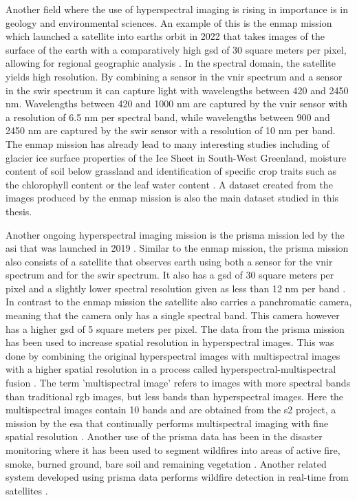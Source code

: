 Another field where the use of hyperspectral imaging is rising in importance is in geology and environmental sciences. An example of this is the \ac{enmap} mission which launched a satellite into earths orbit in 2022 that takes images of the surface of the earth with a comparatively high \ac{gsd} of 30 square meters per pixel, allowing for regional geographic analysis \citep{guanter_enmap_2015}. In the spectral domain, the satellite yields high resolution. By combining a sensor in the \ac{vnir} spectrum and a sensor in the \ac{swir} spectrum it can capture light with wavelengths between 420 and 2450 nm. Wavelengths between 420 and 1000 nm are captured by the \ac{vnir} sensor with a resolution of 6.5 nm per spectral band, while wavelengths between 900 and 2450 nm are captured by the \ac{swir} sensor with a resolution of 10 nm per band.
The \ac{enmap} mission has already lead to many interesting studies including of glacier ice surface properties of the Ice Sheet in South-West Greenland, moisture content of soil below grassland and identification of specific crop traits such as the chlorophyll content or the leaf water content \citep{bohn_glacier_2022}\citep{pascual-venteo_prototyping_2022}\citep{dopper_estimating_2022}.
A dataset created from the images produced by the \ac{enmap} mission is also the main dataset studied in this thesis.

Another ongoing hyperspectral imaging mission is the \ac{prisma} mission led by the \ac{asi} that was launched in 2019 \citep{loizzo_prisma_2019}. Similar to the \ac{enmap} mission, the \ac{prisma} mission also consists of a satellite that observes earth using both a sensor for the \ac{vnir} spectrum and for the \ac{swir} spectrum. It also has a \ac{gsd} of 30 square meters per pixel and a slightly lower spectral resolution given as less than 12 nm per band \cite{guarini_overview_2017}\cite{guarini_prisma_2018}. In contrast to the \ac{enmap} mission the satellite also carries a panchromatic camera, meaning that the camera only has a single spectral band. This camera however has a higher \ac{gsd} of 5 square meters per pixel. The data from the \ac{prisma} mission has been used to increase spatial resolution in hyperspectral images. This was done by combining the original hyperspectral images with multispectral images with a higher spatial resolution in a process called hyperspectral-multispectral fusion \citep{acito_prisma_2022}. The term 'multispectral image' refers to images with more spectral bands than traditional \ac{rgb} images, but less bands than hyperspectral images. Here the multispectral images contain 10 bands and are obtained from the \ac{s2} project, a mission by the \ac{esa} that continually performs multispectral imaging with fine spatial resolution \citep{drusch_sentinel-2_2012}. Another use of the \ac{prisma} data has been in the disaster monitoring where it has been used to segment wildfires into areas of active fire, smoke, burned ground, bare soil and remaining vegetation \citep{spiller_transfer_2022}. Another related system developed using \ac{prisma} data performs wildfire detection in real-time from satellites  \citep{spiller_wildfire_2022}.

